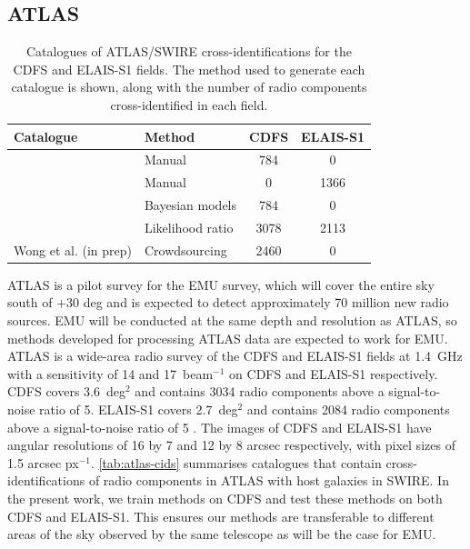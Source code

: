 \documentclass[fleqn,usenatbib,usedcolumn]{mnras}
\newcommand{\jansky}{\text{Jy}}
\begin{document}
  \subsection{ATLAS}\label{sec:atlas}
    \begin{table}
      \caption{Catalogues of ATLAS/SWIRE cross-identifications for the CDFS
        and ELAIS-S1 fields. The method used to generate each catalogue is
        shown, along with the number of radio components cross-identified in each
        field.}
      \label{tab:atlas-cids}
      \begin{tabular}{llcc}
        \hline
        Catalogue & Method & CDFS & ELAIS-S1\\
        \hline
        \citet{norris06} & Manual & 784 & 0\\
        \citet{middelberg08} & Manual & 0 & 1366\\
        \citet{fan15} & Bayesian models & 784 & 0\\
        \citet{weston18lrpy} & Likelihood ratio & 3078 & 2113\\
        Wong et al. (in prep) & Crowdsourcing & 2460 & 0 \\
        \hline
      \end{tabular}
    \end{table}

    ATLAS is a pilot survey for the EMU \citep{norris11} survey, which will
    cover the entire sky south of $+30$ deg and is expected to
    detect approximately 70 million new radio sources. EMU will be conducted
    at the same depth and resolution as ATLAS, so methods developed for
    processing ATLAS data are expected to work for EMU. ATLAS is a wide-area
    radio survey of the CDFS and ELAIS-S1 fields at 1.4~GHz with a sensitivity
    of 14 and \unit{17}{\micro\jansky}~beam$^{-1}$ on CDFS and ELAIS-S1 respectively. CDFS
    covers 3.6~deg$^2$ and contains 3034 radio components above a signal-to-noise ratio of 5.
    ELAIS-S1 covers 2.7~deg$^2$ and contains 2084 radio components above a signal-to-noise ratio of 5 \citep{franzen15}. The images of CDFS and ELAIS-S1 have angular resolutions of 16 by 7 and 12 by 8 arcsec respectively, with pixel sizes of 1.5 arcsec px$^{-1}$. \autoref{tab:atlas-cids} summarises
    catalogues that contain cross-identifications of radio components in ATLAS with host
    galaxies in SWIRE. In the present work, we train methods on CDFS and test these methods on both CDFS and ELAIS-S1.  This ensures our methods are transferable to different areas of the sky observed by the same telescope as will be the case for EMU.
\end{document}
